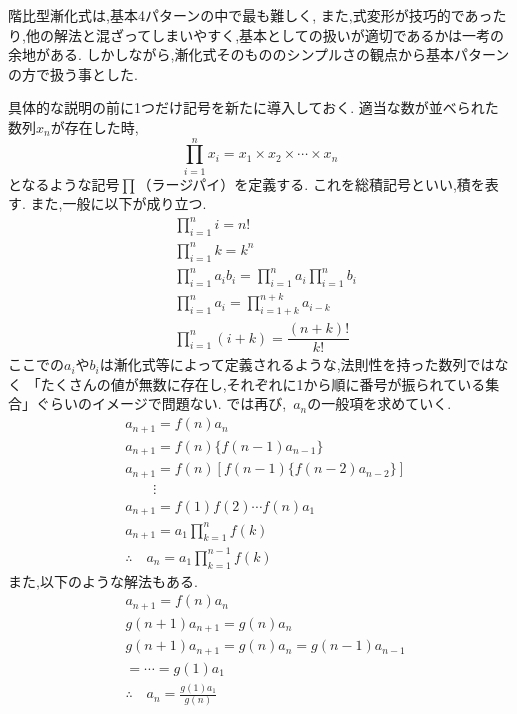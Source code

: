 
階比型漸化式は,基本4パターンの中で最も難しく,
また,式変形が技巧的であったり,他の解法と混ざってしまいやすく,基本としての扱いが適切であるかは一考の余地がある.
しかしながら,漸化式そのもののシンプルさの観点から基本パターンの方で扱う事とした.

具体的な説明の前に1つだけ記号を新たに導入しておく.
適当な数が並べられた数列$x_n$が存在した時,
\[
  \prod_{i=1}^n x_i
  =x_1\times x_2\times\cdots\times x_n
\]
となるような記号$\prod$（ラージパイ）を定義する.
これを総積記号といい,積を表す.
また,一般に以下が成り立つ.
\begin{align*}
   & \prod_{i=1}^{n}i=n!                                                              \\
   & \prod_{i=1}^{n}k=k^n                                                             \\
   & \prod_{i=1}^{n}a_ib_i=\displaystyle\prod_{i=1}^na_i\displaystyle\prod_{i=1}^nb_i \\
   & \prod_{i=1}^{n}a_i=\displaystyle\prod_{i=1+k}^{n+k}a_{i-k}                       \\
   & \prod_{i=1}^{n}(i+k)=\dfrac{(n+k)!}{k!}
\end{align*}
ここでの$a_i$や$b_i$は漸化式等によって定義されるような,法則性を持った数列ではなく
「たくさんの値が無数に存在し,それぞれに1から順に番号が振られている集合」ぐらいのイメージで問題ない.
では再び, \,$a_n$の一般項を求めていく.
\begin{align*}
   & a_{n+1}=f(n)a_n                                  \\
   & a_{n+1}=f(n)\{f(n-1)a_{n-1}\}                    \\
   & a_{n+1}=f(n)\left[f(n-1)\{f(n-2)a_{n-2}\}\right] \\
   & \qquad \vdots                                    \\
   & a_{n+1}=f(1)f(2) \cdots f(n)a_1                  \\
   & a_{n+1}=a_1 \prod_{k=1}^n f(k)                   \\
   & \therefore \quad a_n=a_1 \prod_{k=1}^{n-1} f(k)
\end{align*}
また,以下のような解法もある.
\begin{align*}
   & a_{n+1}=f(n)a_n                           \\
   & g(n+1)a_{n+1}=g(n)a_n                     \\
   & g(n+1)a_{n+1}=g(n)a_n=g(n-1)a_{n-1}       \\
   & =\cdots=g(1)a_1                           \\
   & \therefore \quad a_n=\frac{g(1)a_1}{g(n)}
\end{align*}
